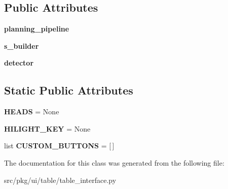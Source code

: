 \subsection*{Public Attributes}
\begin{DoxyCompactItemize}
\item 
\mbox{\label{classrnb-planning_1_1src_1_1pkg_1_1ui_1_1table_1_1table__interface_1_1_table_interface_a34566bd3fd79281868b947aa5374019b}} 
{\bfseries planning\+\_\+pipeline}
\item 
\mbox{\label{classrnb-planning_1_1src_1_1pkg_1_1ui_1_1table_1_1table__interface_1_1_table_interface_a0b545eacaa04ca141018fa2621e7e734}} 
{\bfseries s\+\_\+builder}
\item 
\mbox{\label{classrnb-planning_1_1src_1_1pkg_1_1ui_1_1table_1_1table__interface_1_1_table_interface_a68829def413d45317b5cf278f2c740e2}} 
{\bfseries detector}
\end{DoxyCompactItemize}
\subsection*{Static Public Attributes}
\begin{DoxyCompactItemize}
\item 
\mbox{\label{classrnb-planning_1_1src_1_1pkg_1_1ui_1_1table_1_1table__interface_1_1_table_interface_a963f2f25f8681bfc63bd32838dcd3317}} 
{\bfseries H\+E\+A\+DS} = None
\item 
\mbox{\label{classrnb-planning_1_1src_1_1pkg_1_1ui_1_1table_1_1table__interface_1_1_table_interface_a23344ddb043b89e2852f374f70d01af3}} 
{\bfseries H\+I\+L\+I\+G\+H\+T\+\_\+\+K\+EY} = None
\item 
\mbox{\label{classrnb-planning_1_1src_1_1pkg_1_1ui_1_1table_1_1table__interface_1_1_table_interface_acd4818adcde7806adb30078edce93ccc}} 
list {\bfseries C\+U\+S\+T\+O\+M\+\_\+\+B\+U\+T\+T\+O\+NS} = \mbox{[}$\,$\mbox{]}
\end{DoxyCompactItemize}


The documentation for this class was generated from the following file\+:\begin{DoxyCompactItemize}
\item 
src/pkg/ui/table/table\+\_\+interface.\+py\end{DoxyCompactItemize}
